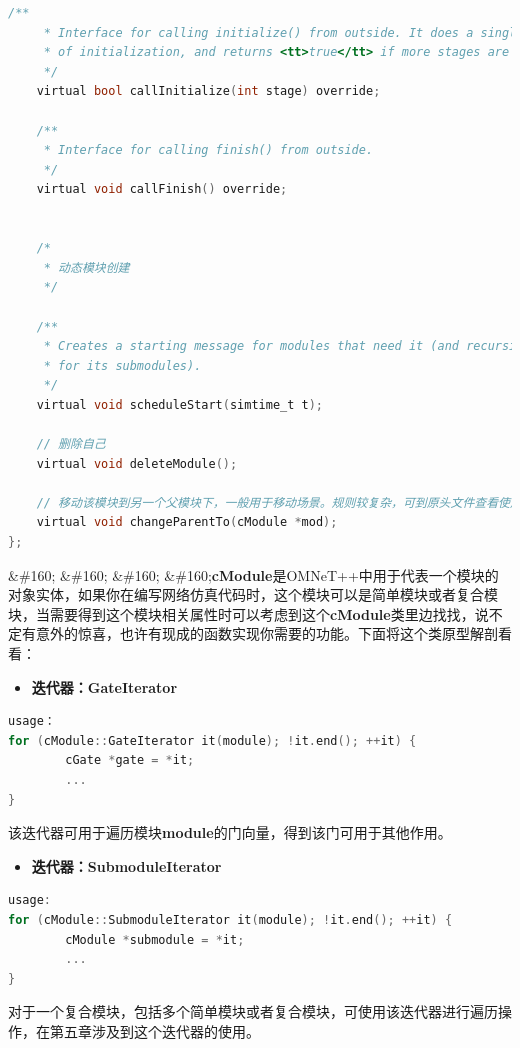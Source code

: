 \begin{lstlisting}[language=c]
    /**
     * Interface for calling initialize() from outside. It does a single stage
     * of initialization, and returns <tt>true</tt> if more stages are required.
     */
    virtual bool callInitialize(int stage) override;

    /**
     * Interface for calling finish() from outside.
     */
    virtual void callFinish() override;


    /*
     * 动态模块创建
     */

    /**
     * Creates a starting message for modules that need it (and recursively
     * for its submodules).
     */
    virtual void scheduleStart(simtime_t t);

    // 删除自己
    virtual void deleteModule();

    // 移动该模块到另一个父模块下，一般用于移动场景。规则较复杂，可到原头文件查看使用说明
    virtual void changeParentTo(cModule *mod);
};
\end{lstlisting}

\&\#160; \&\#160; \&\#160; \&\#160;\textbf{cModule}是OMNeT++中用于代表一个模块的对象实体，如果你在编写网络仿真代码时，这个模块可以是简单模块或者复合模块，当需要得到这个模块相关属性时可以考虑到这个\textbf{cModule}类里边找找，说不定有意外的惊喜，也许有现成的函数实现你需要的功能。下面将这个类原型解剖看看：

\begin{itemize}
\item \textbf{迭代器：GateIterator}

\end{itemize}

\begin{lstlisting}[language=c]
usage：
for (cModule::GateIterator it(module); !it.end(); ++it) {
        cGate *gate = *it;
        ...
}
\end{lstlisting}

该迭代器可用于遍历模块\textbf{module}的门向量，得到该门可用于其他作用。

\begin{itemize}
\item \textbf{迭代器：SubmoduleIterator}

\end{itemize}

\begin{lstlisting}[language=c]
usage:
for (cModule::SubmoduleIterator it(module); !it.end(); ++it) {
        cModule *submodule = *it;
        ...
}
\end{lstlisting}

对于一个复合模块，包括多个简单模块或者复合模块，可使用该迭代器进行遍历操作，在第五章涉及到这个迭代器的使用。

